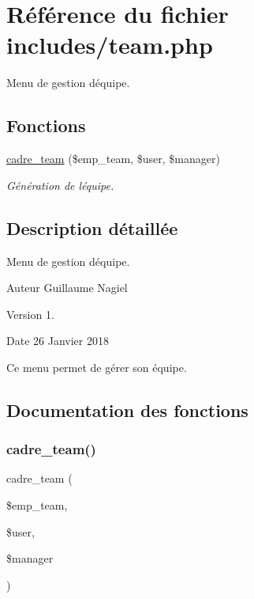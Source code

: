 \hypertarget{team_8php}{}\section{Référence du fichier includes/team.php}
\label{team_8php}


Menu de gestion d\textquotesingle{}équipe.  


\subsection*{Fonctions}
\begin{DoxyCompactItemize}
\item 
\mbox{\hyperlink{team_8php_a374fad912a341fd7ef5773fc41273b5d}{cadre\+\_\+team}} (\$emp\+\_\+team, \$user, \$manager)
\begin{DoxyCompactList}\small\item\em Génération de l\textquotesingle{}équipe. \end{DoxyCompactList}\end{DoxyCompactItemize}


\subsection{Description détaillée}
Menu de gestion d\textquotesingle{}équipe. 

\begin{DoxyAuthor}{Auteur}
Guillaume Nagiel 
\end{DoxyAuthor}
\begin{DoxyVersion}{Version}
1. 
\end{DoxyVersion}
\begin{DoxyDate}{Date}
26 Janvier 2018
\end{DoxyDate}
Ce menu permet de gérer son équipe. 

\subsection{Documentation des fonctions}
\mbox{\label{team_8php_a374fad912a341fd7ef5773fc41273b5d}} 
\subsubsection{\texorpdfstring{cadre\+\_\+team()}{cadre\_team()}}
{\footnotesize\ttfamily cadre\+\_\+team (\begin{DoxyParamCaption}\item[{}]{\$emp\+\_\+team,  }\item[{}]{\$user,  }\item[{}]{\$manager }\end{DoxyParamCaption})}



